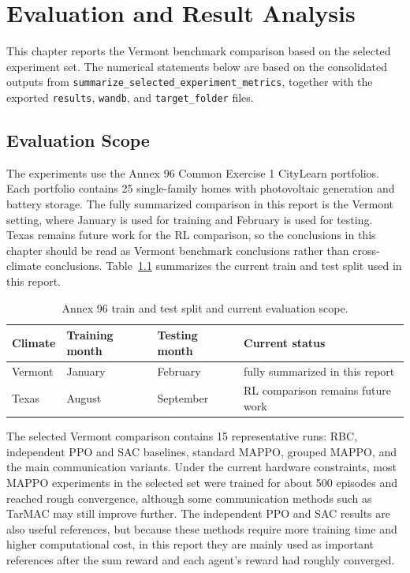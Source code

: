 ﻿\chapter{Evaluation and Result Analysis}\label{ch:eval}

This chapter reports the Vermont benchmark comparison based on the selected
experiment set. The numerical statements below are based on the consolidated
outputs from
\nolinkurl{summarize_selected_experiment_metrics}, together with the exported
\texttt{results}, \texttt{wandb}, and \texttt{target\_folder} files.

\section{Evaluation Scope}

The experiments use the Annex 96 Common Exercise 1 CityLearn portfolios. Each
portfolio contains 25 single-family homes with photovoltaic generation and
battery storage. The fully summarized comparison in this report is the Vermont
setting, where January is used for training and February is used for testing.
Texas remains future work for the RL comparison, so the conclusions in this
chapter should be read as Vermont benchmark conclusions rather than
cross-climate conclusions. Table~\ref{tab:split} summarizes the current
train and test split used in this report.

\begin{table}[!htbp]
\begin{center}
\begin{tabular}{|l|l|l|l|}
\hline
Climate & Training month & Testing month & Current status \\
\hline
Vermont & January & February & fully summarized in this report \\
Texas & August & September & RL comparison remains future work \\
\hline
\end{tabular}
\end{center}
\caption{Annex 96 train and test split and current evaluation scope.}
\label{tab:split}
\end{table}

The selected Vermont comparison contains 15 representative runs: RBC,
independent PPO and SAC baselines, standard MAPPO, grouped MAPPO, and the main
communication variants. Under the current hardware constraints, most MAPPO
experiments in the selected set were trained for about 500 episodes and reached
rough convergence, although some communication methods such as TarMAC may still
improve further. The independent PPO and SAC results are also useful
references, but because these methods require more training time and higher
computational cost, in this report they are mainly used as important references
after the sum reward and each agent's reward had roughly converged.

